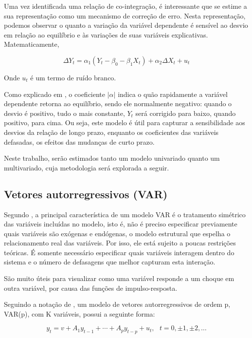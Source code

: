 \documentclass[a4paper,
               article,
               12pt,
               openany,
               oneside,
               english,
               brazil]{abntex2}
\numberwithin{equation}{section}
\begin{document}
    Uma vez identificada uma relação de co-integração, é interessante que se estime a sua representação como um mecanismo de correção de erro. Nesta representação, podemos observar o quanto a variação da variável dependente é sensível ao desvio em relação ao equilíbrio e às variações de suas variáveis explicativas. Matematicamente, 

    \begin{equation}
        \Delta Y_t = \alpha_1 (Y_t - \beta_0 - \beta_1 X_t) + \alpha_2 \Delta X_t + u_t \label{ecm}
    \end{equation}

    Onde $ u_t $ é um termo de ruído branco. 
    
    Como explicado em \textcite{coint1}, o coeficiente $ \lvert \alpha \rvert $ indica o quão rapidamente a variável dependente retorna ao equilíbrio, sendo ele normalmente negativo: quando o desvio é positivo, tudo o mais constante, $ Y_t $ será corrigido para baixo, quando positivo, para cima. Ou seja, este modelo é útil para capturar a sensibilidade aos desvios da relação de longo prazo, enquanto os coeficientes das variáveis defasadas, os efeitos das mudanças de curto prazo.
    
    Neste trabalho, serão estimados tanto um modelo univariado quanto um multivariado, cuja metodologia será explorada a seguir.

    \subsection{Vetores autorregressivos (VAR)}

    Segundo \textcite[51-52]{gustavo}, a principal característica de um modelo VAR é o tratamento simétrico das variáveis incluídas no modelo, isto é, não é preciso especificar previamente quais variáveis são exógenas e endógenas, o modelo estrutural que espelha o relacionamento real das variáveis. Por isso, ele está sujeito a poucas restrições teóricas. É somente necessário especificar quais variáveis interagem dentro do sistema e o número de defasagens que melhor capturam esta interação.
    
    São muito úteis para visualizar como uma variável responde a um choque em outra variável, por causa das funções de impulso-resposta. 

    Seguindo a notação de \textcite[p.~13]{lutkepool}, um modelo de vetores autorregressivos de ordem p, VAR(p), com K variáveis, possui a seguinte forma:

    \begin{equation}
        \label{VAR}
        y_t = v + A_1 y_{t-1} + \cdots + A_p y_{t-p} + u_t,\text{\ \ } t = 0, \pm 1, \pm 2, \ldots
    \end{equation}
\end{document}
